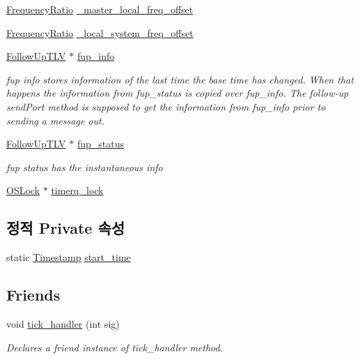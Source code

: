 \begin{DoxyCompactItemize}
\hyperlink{ptptypes_8hpp_a84de47dc2ed889ecd2b61706d3ad0f2e}{Frequency\+Ratio} \hyperlink{class_i_e_e_e1588_clock_acaa18d3a0781792994fc1f34c8f43773}{\+\_\+master\+\_\+local\+\_\+freq\+\_\+offset}
\item 
\hyperlink{ptptypes_8hpp_a84de47dc2ed889ecd2b61706d3ad0f2e}{Frequency\+Ratio} \hyperlink{class_i_e_e_e1588_clock_ad28017a023b91ce56dba976677a7ce1a}{\+\_\+local\+\_\+system\+\_\+freq\+\_\+offset}
\item 
\hyperlink{class_follow_up_t_l_v}{Follow\+Up\+T\+LV} $\ast$ \hyperlink{class_i_e_e_e1588_clock_a9df8b5f3401b8f4ad34dfb75c956d008}{fup\+\_\+info}
\begin{DoxyCompactList}\small\item\em fup info stores information of the last time the base time has changed. When that happens the information from fup\+\_\+status is copied over fup\+\_\+info. The follow-\/up send\+Port method is supposed to get the information from fup\+\_\+info prior to sending a message out. \end{DoxyCompactList}\item 
\hyperlink{class_follow_up_t_l_v}{Follow\+Up\+T\+LV} $\ast$ \hyperlink{class_i_e_e_e1588_clock_aaf00539b688a0556fd64ed67d46baea8}{fup\+\_\+status}
\begin{DoxyCompactList}\small\item\em fup status has the instantaneous info \end{DoxyCompactList}\item 
\hyperlink{class_o_s_lock}{O\+S\+Lock} $\ast$ \hyperlink{class_i_e_e_e1588_clock_ad5be8ae90ecd7c06aafab66d0d02b4b8}{timerq\+\_\+lock}
\end{DoxyCompactItemize}
\subsection*{정적 Private 속성}
\begin{DoxyCompactItemize}
\item 
static \hyperlink{class_timestamp}{Timestamp} \hyperlink{class_i_e_e_e1588_clock_ac1c443e970535eaf9e0ed94855c0ff4c}{start\+\_\+time}
\end{DoxyCompactItemize}
\subsection*{Friends}
\begin{DoxyCompactItemize}
\item 
void \hyperlink{class_i_e_e_e1588_clock_a9288508153b5bbe58b69c941dae449f0}{tick\+\_\+handler} (int sig)
\begin{DoxyCompactList}\small\item\em Declares a friend instance of tick\+\_\+handler method. \end{DoxyCompactList}\end{DoxyCompactItemize}


